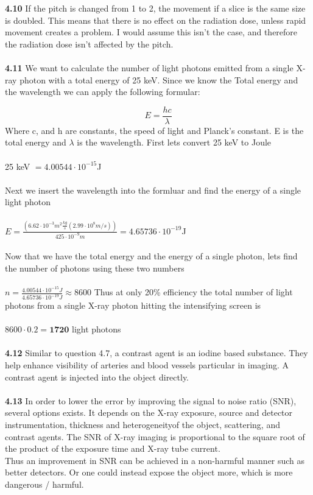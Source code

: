 \documentclass[]{article}
\begin{document}
\textbf{4.10} If the pitch is changed from 1 to 2, the movement  if a slice is the same size is doubled. This means that there is no effect on the radiation dose, unless rapid movement creates a problem. I would assume this isn't the case, and therefore the radiation dose isn't affected by the pitch.\\\\
\textbf{4.11} We want to calculate the number of light photons emitted from a single X-ray photon with a total energy of 25 keV. Since we know the Total energy and the wavelength we can apply the following formular:

\begin{equation}
	E = \frac{hc}{\lambda}
\end{equation}
Where c, and h are constants, the speed of light and Planck's constant. E is the total energy and $\lambda$ is the wavelength. First lets convert 25 keV to Joule\\\\
25 keV $= 4.00544 \cdot 10^{-15}$J\\\\
Next we insert the wavelength into the formluar and find the energy of a single light photon\\\\
$E = \frac{(6.62 \cdot 10^{-3}m^2\frac{kg}{s} (2.99 \cdot 10^8m/s ) )}{425 \cdot 10^{-9}m} = 4.65736 \cdot 10^{-19}$J\\\\
Now that we have the total energy and the energy of a single photon, lets find the number of photons using these two numbers\\\\
$ n = \frac{4.00544 \cdot 10^{-15}J}{4.65736 \cdot 10^{-19}J} \approx 8600$
Thus at only 20\% efficiency the total number of light photons from a single X-ray photon hitting the intensifying screen is\\\\
$8600 \cdot 0.2 = \textbf{1720}$ light photons\\\\
\textbf{4.12} Similar to question 4.7, a contrast agent is an iodine based substance. They help enhance visibility of arteries and blood vessels particular in imaging. A contrast agent is injected into the object directly.\\\\
\textbf{4.13} In order to lower the error by improving the signal to noise ratio (SNR), several options exists. It depends on the X-ray
exposure, source and detector instrumentation, thickness and heterogeneityof the object, scattering, and contrast agents. The SNR of X-ray imaging is proportional to the square root of the product of the exposure time and X-ray tube current.\\ Thus an improvement in SNR can be achieved in a non-harmful manner such as better detectors. Or one could instead expose the object more, which is more dangerous / harmful.
\end{document}
